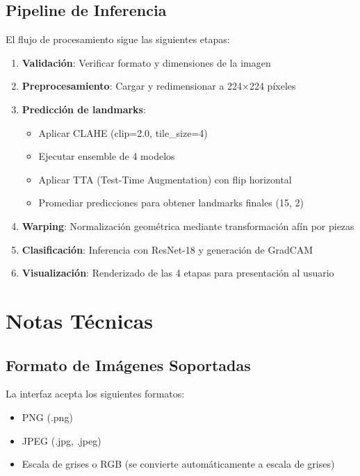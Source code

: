 \subsection{Pipeline de Inferencia}

El flujo de procesamiento sigue las siguientes etapas:

\begin{enumerate}
    \item \textbf{Validación}: Verificar formato y dimensiones de la imagen
    \item \textbf{Preprocesamiento}: Cargar y redimensionar a 224×224 píxeles
    \item \textbf{Predicción de landmarks}:
    \begin{itemize}
        \item Aplicar CLAHE (clip=2.0, tile\_size=4)
        \item Ejecutar ensemble de 4 modelos
        \item Aplicar TTA (Test-Time Augmentation) con flip horizontal
        \item Promediar predicciones para obtener landmarks finales (15, 2)
    \end{itemize}
    \item \textbf{Warping}: Normalización geométrica mediante transformación afín por piezas
    \item \textbf{Clasificación}: Inferencia con ResNet-18 y generación de GradCAM
    \item \textbf{Visualización}: Renderizado de las 4 etapas para presentación al usuario
\end{enumerate}

\section{Notas Técnicas}

\subsection{Formato de Imágenes Soportadas}

La interfaz acepta los siguientes formatos:
\begin{itemize}
    \item PNG (.png)
    \item JPEG (.jpg, .jpeg)
    \item Escala de grises o RGB (se convierte automáticamente a escala de grises)
\end{itemize}

